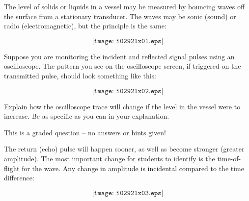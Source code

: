 

The level of solids or liquids in a vessel may be measured by bouncing waves off the surface from a stationary transducer.  The waves may be sonic (sound) or radio (electromagnetic), but the principle is the same:

$$\texttt{[image: i02921x01.eps]}$$

Suppose you are monitoring the incident and reflected signal pulses using an oscilloscope.  The pattern you see on the oscilloscope screen, if triggered on the transmitted pulse, should look something like this:

$$\texttt{[image: i02921x02.eps]}$$

Explain how the oscilloscope trace will change if the level in the vessel were to increase.  Be as specific as you can in your explanation.

\vfil 

\eject






This is a graded question -- no answers or hints given!
 






The return (echo) pulse will happen sooner, as well as become stronger (greater amplitude).  The most important change for students to identify is the time-of-flight for the wave.  Any change in amplitude is incidental compared to the time difference:

$$\texttt{[image: i02921x03.eps]}$$




